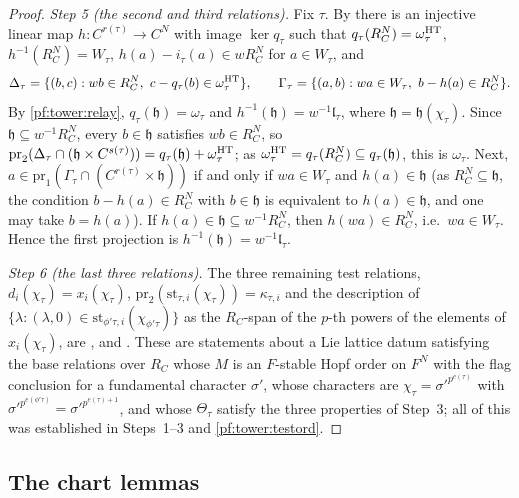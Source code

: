 \begin{proof}
\emph{Step 5 (the second and third relations).} Fix $\tau$. By
 there is an injective linear map $h\colon C^{r(\tau)}\to C^N$ with
image $\ker q_\tau$ such that $q_\tau(R_C^N)=\omega^{\mathrm{HT}}_\tau$, $h^{-1}(R_C^N)=W_\tau$, $h(a)-i_\tau(a)\in wR_C^N$ for
$a\in W_\tau$, and
\[
\Delta_\tau=\{(b,c):wb\in R_C^N,\ c-q_\tau(b)\in\omega^{\towerHT}_\tau\},\qquad
\Gamma_\tau=\{(a,b):wa\in W_\tau,\ b-h(a)\in R_C^N\}.
\]
By \cref{pf:tower:relay}, $q_\tau(\mathfrak h)=\omega_\tau$ and $h^{-1}(\mathfrak h)=w^{-1}\mathfrak l_\tau$, where
$\mathfrak h=\mathfrak h(\chi_\tau)$. Since $\mathfrak h\subseteq w^{-1}R_C^N$, every $b\in\mathfrak h$ satisfies $wb\in R_C^N$, so
$\mathrm{pr}_2(\Delta_\tau\cap(\mathfrak h\times C^{s(\tau)}))=q_\tau(\mathfrak h)+\omega^{\mathrm{HT}}_\tau$; as
$\omega^{\mathrm{HT}}_\tau=q_\tau(R_C^N)\subseteq q_\tau(\mathfrak h)$, this is $\omega_\tau$. Next,
$a\in\mathrm{pr}_1(\Gamma_\tau\cap(C^{r(\tau)}\times\mathfrak h))$ if and only if $wa\in W_\tau$ and $h(a)\in\mathfrak h$ (as
$R_C^N\subseteq\mathfrak h$, the condition $b-h(a)\in R_C^N$ with $b\in\mathfrak h$ is equivalent to $h(a)\in\mathfrak h$, and one may
take $b=h(a)$). If $h(a)\in\mathfrak h\subseteq w^{-1}R_C^N$, then $h(wa)\in R_C^N$, i.e.\ $wa\in W_\tau$. Hence the first
projection is $h^{-1}(\mathfrak h)=w^{-1}\mathfrak l_\tau$.

\emph{Step 6 (the last three relations).} The three remaining test relations, $d_i(\chi_\tau)=x_i(\chi_\tau)$,
$\mathrm{pr}_2(\mathrm{st}_{\tau,i}(\chi_\tau))=\kappa_{\tau,i}$ and the description of $\{\lambda:(\lambda,0)\in
\mathrm{st}_{\phi'\tau,i}(\chi_{\phi'\tau})\}$ as the $R_C$-span of the $p$-th powers of the elements of $x_i(\chi_\tau)$, are
,
 and
. These are statements about a Lie lattice datum
satisfying the base relations over $R_C$ whose $M$ is an $F$-stable Hopf order on $F^N$ with the flag conclusion for a
fundamental character $\sigma'$, whose characters are $\chi_\tau=\sigma'^{p^{e(\tau)}}$ with
$\sigma'^{p^{e(\phi'\tau)}}=\sigma'^{p^{e(\tau)+1}}$, and whose $\Theta_\tau$ satisfy the three properties of Step~3; all of this
was established in Steps~1--3 and \cref{pf:tower:testord}.
\end{proof}

\subsection{The chart lemmas}\label{pf:tower:sec-chart}

